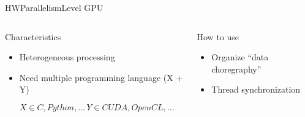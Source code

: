 %
\begin{Frame}{HWParallelismLevel GPU}
  \begin{columns}[t]
    \begin{column}{\HW} %
      \begin{block}{Characteristics}
        \begin{itemize}
        \item Heterogeneous processing
        \item Need multiple programming language (X + Y)

          $X \in {C, Python, ...}\, Y \in {CUDA, OpenCL, ...}$
        \end{itemize}
      \end{block} 
    \end{column}
    
    \begin{column}{\HW} %
      \begin{block}{How to use}
        \begin{itemize}
        \item Organize ``data choregraphy''
        \item Thread synchronization
        \end{itemize}
      \end{block}   
    \end{column}
  \end{columns}  
\end{Frame}


